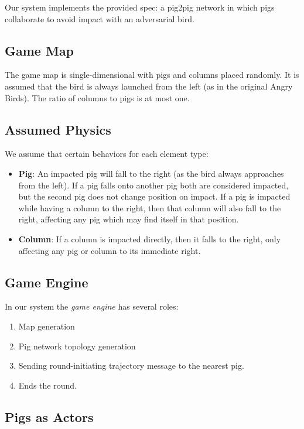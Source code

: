 Our system implements the provided spec: a pig2pig network in which pigs
collaborate to avoid impact with an adversarial bird.

\subsection{Game Map}

The game map is single-dimensional with pigs and columns placed
randomly. It is assumed that the bird is always launched from the left
(as in the original Angry Birds). The ratio of columns to pigs is at
most one.

\subsection{Assumed Physics}

We assume that certain behaviors for each element type:

\begin{itemize}
\item
  \textbf{Pig}: An impacted pig will fall to the right (as the bird
  always approaches from the left). If a pig falls onto another pig both
  are considered impacted, but the second pig does not change position
  on impact. If a pig is impacted while having a column to the right,
  then that column will also fall to the right, affecting any pig which
  may find itself in that position.
\item
  \textbf{Column}: If a column is impacted directly, then it falls to
  the right, only affecting any pig or column to its immediate right.
\end{itemize}

\subsection{Game Engine}

In our system the \emph{game engine} has several roles:

\begin{enumerate}[1.]
\item
  Map generation
\item
  Pig network topology generation
\item
  Sending round-initiating trajectory message to the nearest pig.
\item
  Ends the round.
\end{enumerate}

\subsection{Pigs as Actors}

